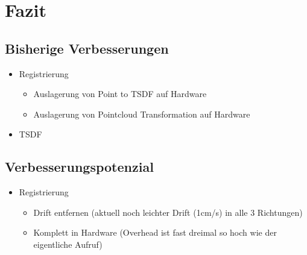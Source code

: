 \documentclass{beamer}
\begin{document}
\section{Fazit}
\begin{frame}{}
\begin{center}
\end{center}
\end{frame}

\subsection{Bisherige Verbesserungen}
\begin{frame}{\subsecname}
\begin{itemize}
\item{Registrierung}
\begin{itemize}
\item{Auslagerung von Point to TSDF auf Hardware}
\item{Auslagerung von Pointcloud Transformation auf Hardware}
\end{itemize}
\item{TSDF}
\end{itemize}
\end{frame}

\subsection{Verbesserungspotenzial}
\begin{frame}{\subsecname}
\begin{itemize}
\item{Registrierung}
\begin{itemize}
\item{Drift entfernen (aktuell noch leichter Drift (1cm/s) in alle 3 Richtungen)}
\item{Komplett in Hardware (Overhead ist fast dreimal so hoch wie der eigentliche Aufruf)}
\end{itemize}
\end{itemize}
\end{frame}
\end{document}
